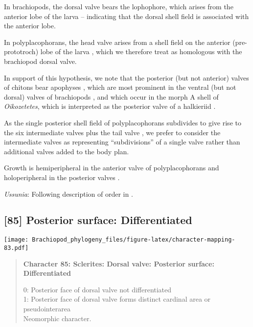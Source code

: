 \documentclass[openany]{book}
\theoremstyle{definition}
\theoremstyle{definition}
\theoremstyle{definition}
\theoremstyle{remark}
\begin{document}
In brachiopods, the dorsal valve bears the lophophore, which arises from
the anterior lobe of the larva \citep{Altenburger2013} -- indicating
that the dorsal shell field is associated with the anterior lobe.

In polyplacophorans, the head valve arises from a shell field on the
anterior (pre-prototroch) lobe of the larva \citep{Wanninger2002C},
which we therefore treat as homologous with the brachiopod dorsal valve.

In support of this hypothesis, we note that the posterior (but not
anterior) valves of chitons bear apophyses
\citep{Schwabe2010, Connors2012}, which are most prominent in the
ventral (but not dorsal) valves of brachiopods \citep[fig.
322]{Williams1997Introduction}, and which occur in the morph A shell of
\emph{Oikozetetes}, which is interpreted as the posterior valve of a
halkieriid \citep{Paterson2009}.

As the single posterior shell field of polyplacophorans subdivides to
give rise to the six intermediate valves plus the tail valve
\citep{Wanninger2002C}, we prefer to consider the intermediate valves as
representing ``subdivisions'' of a single valve rather than additional
valves added to the body plan.

Growth is hemiperipheral in the anterior valve of polyplacophorans and
holoperipheral in the posterior valves \citep{Schwabe2010, Connors2012}.

\hypertarget{Ussunia-coding-84}{}
\emph{Ussunia}: Following description of order in
\citet{Williams2000LinguliformeaCraniiformea}.

\subsection*{{[}85{]} Posterior surface:
Differentiated}\label{posterior-surface-differentiated}

\texttt{[image: Brachiopod\_phylogeny\_files/figure-latex/character-mapping-83.pdf]}

\begin{quote}
\textbf{Character 85: Sclerites: Dorsal valve: Posterior surface:
Differentiated}

0: Posterior face of dorsal valve not differentiated\\
1: Posterior face of dorsal valve forms distinct cardinal area or
pseudointerarea\\
Neomorphic character.
\end{quote}
\end{document}
